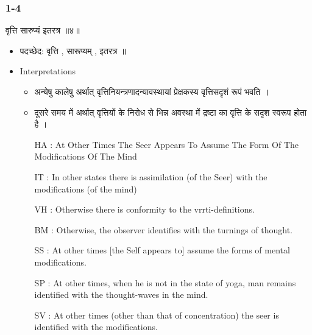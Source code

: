 \begin{frame}[fragile]\frametitle{1-4}

\begin{sanskrit}
वृत्ति सारुप्यं इतरत्र ॥४॥
\end{sanskrit}


	\begin{itemize}
	\item पदच्छेद: वृत्ति , सारूप्यम् , इतरत्र ॥
	\item Interpretations
		\begin{itemize}	
		\item अन्येषु कालेषु अर्थात् वृत्तिनियन्त्रणादन्यावस्थायां प्रेक्षकस्य वृत्तिसदृशं रूपं भवति ।
		\item दूसरे समय में अर्थात् वृत्तियों के निरोध से भिन्न अवस्था में द्रष्टा का वृत्ति के सदृश स्वरूप होता है ।
		\item [HA]: At Other Times The Seer Appears To Assume The Form Of The Modifications Of The Mind
		\item [IT]: In other states there is assimilation (of the Seer) with the modifications (of the mind)
		\item [VH]: Otherwise there is conformity to the vrrti-definitions.
		\item [BM]: Otherwise, the observer identifies with the turnings of thought.
		\item [SS]: At other times [the Self appears to] assume the forms of mental modifications.
		\item [SP]: At other times, when he is not in the state of yoga, man remains identified with the thought-waves in the mind.
		\item [SV]: At other times (other than that of concentration) the seer is identified with the modifications.	
		\end{itemize}
	\end{itemize}

\end{frame}


